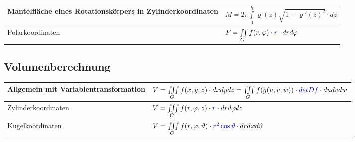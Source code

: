 \begin{tabular}{|p{5.5 cm}|p{10cm}|}
\begin{minipage}{5.5cm}
  		Mantelfläche eines Rotationskörpers in Zylinderkoordinaten    
    \end{minipage}&
	\begin{minipage}{10cm}
    	\vspace{0.1cm}
		$M = 2\pi\int\limits_0^h\varrho(z)\sqrt{1+\varrho'(z)^2}\cdot dz$
    	\vspace{0.1cm}
    \end{minipage}\\
	\hline
	Polarkoordinaten &
	\begin{minipage}{10cm}
    	\vspace{0.1cm}
		$F=\iint\limits_G f(r,\varphi)\cdot \textcolor{blue}{r} \cdot dr d\varphi $
    	\vspace{0.1cm}
    \end{minipage}\\
	\hline
\end{tabular}

\subsection{Volumenberechnung}
\begin{tabular}{|p{6 cm}|p{10cm}|}
	\hline
	Allgemein mit Variablentransformation &
	\begin{minipage}{10cm}
    	\vspace{0.1cm}
		$V=\iiint\limits_G f(x,y,z)\cdot dxdydz=\iiint\limits_G f(g(u,v,w))\cdot
		\textcolor{blue}{detDf}\cdot dudvdw$
    	\vspace{0.1cm}
    \end{minipage}\\
	\hline
	Zylinderkoordinaten &
	\begin{minipage}{10cm}
    	\vspace{0.1cm}
		$V=\iiint\limits_G f(r,\varphi,z)\cdot \textcolor{blue}{r} \cdot
		dr d\varphi dz$
    	\vspace{0.1cm}
    \end{minipage}\\
	\hline
	Kugelkoordinaten &
	\begin{minipage}{10cm}
    	\vspace{0.1cm}
		$V=\iiint\limits_G f(r,\varphi,\vartheta)\cdot \textcolor{blue}{r^2
		\cos\vartheta} \cdot dr d\varphi d\vartheta$
    	\vspace{0.1cm}
    \end{minipage}\\
	\hline	
\end{tabular}

